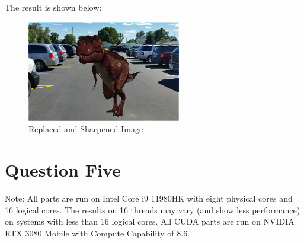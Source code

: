 \documentclass[12pt]{article}
\begin{document}
The result is shown below:

\begin{figure}[H]
	\centering
	\includegraphics[width=0.6\textwidth]{./images/Q4/sharpened.bmp}	
	\cprotect\caption{Replaced and Sharpened Image}
	\label{fig:3-2}
\end{figure}


\newpage

\section{Question Five}

Note: All parts are run on Intel Core i9 11980HK with eight physical cores and 16 logical cores. The results on 16 threads may vary (and show less performance) on systems with less than 16 logical cores. All CUDA parts are run on NVIDIA RTX 3080 Mobile with Compute Capability of 8.6.
\end{document}
